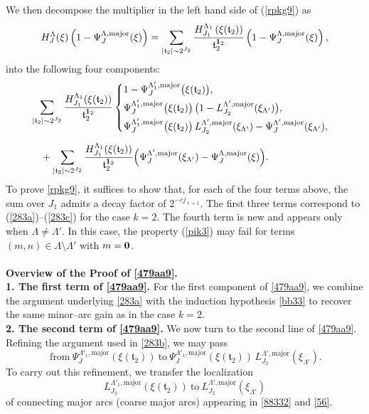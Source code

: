 \documentclass[11 pt,letterpaper]{amsart}
\theoremstyle{plain}
\theoremstyle{definition}
\theoremstyle{remark} \theoremstyle{exam} \theoremstyle{ob}
\numberwithin{equation}{section}
\begin{document}
We then decompose the multiplier in the left hand side of (\ref{rpkg9}) as
\[  H^{\Lambda}_J(\xi) \left( 1 - \Psi^{\Lambda,\mathrm{major}}_{J}(\xi) \right)=
\sum_{|\mathfrak{t}_2|\sim 2^{J_2}} 
\frac{ H^{\Lambda_{1}}_{J_1}\left( \xi(\mathfrak{t}_2) \right)}{\mathfrak{t}_{2}^{{\bf 1}_2}} \left( 1 - \Psi^{\Lambda,\mathrm{major}}_{J}(\xi) \right),
\]
into the following four components:
\begin{align}\label{479aa9}
&\sum_{|\mathfrak{t}_2|\sim 2^{J_2}}
\frac{ H^{\Lambda_{1}}_{J_1}\!\left( \xi(\mathfrak{t}_2) \right)}{\mathfrak{t}_{2}^{{\bf 1}_2}}
\begin{cases}
1 - \Psi^{\Lambda'_{1},\mathrm{major}}_{J}\bigl(\xi(\mathfrak{t}_2)\bigr), \\[3pt]
\Psi^{\Lambda'_{1},\mathrm{major}}_{J}\bigl(\xi(\mathfrak{t}_2)\bigr)\,
\bigl( 1 - L^{\Lambda',\mathrm{major}}_{J_2}(\xi_{\Lambda'}) \bigr), \\[3pt]
\Psi^{\Lambda'_{1},\mathrm{major}}_{J}\bigl(\xi(\mathfrak{t}_2)\bigr)\,
L^{\Lambda',\mathrm{major}}_{J_2}(\xi_{\Lambda'})
- \Psi^{\Lambda',\mathrm{major}}_{J}(\xi_{\Lambda'}),
\end{cases} \\[5pt]
&\quad +
\sum_{|\mathfrak{t}_2|\sim 2^{J_2}}
\frac{ H^{\Lambda_{1}}_{J_1}\!\left( \xi(\mathfrak{t}_2) \right)}{\mathfrak{t}_{2}^{{\bf 1}_2}}
\Bigl(
\Psi^{\Lambda',\mathrm{major}}_{J}(\xi_{\Lambda'})
- \Psi^{\Lambda,\mathrm{major}}_{J}(\xi)
\Bigr). \nonumber
\end{align}
To prove \eqref{rpkg9}, it suffices to show that, for each of the four terms above, the sum over $J_1$ admits a decay factor of $2^{-c j_{\ell+1}}$.
The first three terms correspond  to (\ref{283a})--(\ref{283c}) for the case $k=2$. The fourth term is new and appears only when $\Lambda\ne \Lambda'$. In this case, the property (\ref{pik3}) may fail for terms $(m,n)\in\Lambda\setminus\Lambda'$ with $m={\bf 0}$.
\\
\\
\textbf{Overview of the Proof of \eqref{479aa9}.}\\
\noindent\textbf{1. The first term of \eqref{479aa9}.}
For the first component of \eqref{479aa9}, we combine the argument underlying 
\eqref{283a} with the induction hypothesis \eqref{bb33} to recover the same minor–arc gain as in the case $k=2$. \\
\noindent\textbf{2. The second term of \eqref{479aa9}.}
We now turn to the second line of \eqref{479aa9}.
Refining the argument used in \eqref{283b},  we may pass
\[\ \text{from}\ 
\Psi_{J}^{\Lambda'_1,\mathrm{major}}\!\left(\xi(\mathfrak{t}_2)\right)
\ \text{to}\ 
\Psi_{J}^{\Lambda'_1,\mathrm{major}}\!\left(\xi(\mathfrak{t}_2)\right)
\,L^{\Lambda',\mathrm{major}}_{J_2}(\xi_{\Lambda'}).
\]
To carry out this refinement, we transfer the localization
\[
L_{J_2}^{\Lambda'_1,\mathrm{major}}\!\left(\xi(\mathfrak{t}_2)\right)
\ \text{to}\ 
L_{J_2}^{\Lambda',\mathrm{major}}(\xi_{\Lambda'})
\]
of connecting major arcs (coarse major arcs) appearing in  \eqref{88332} and \eqref{56}.
\end{document}

